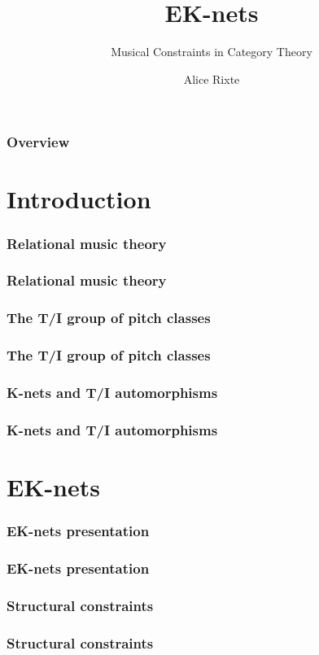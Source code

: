 \documentclass{beamer}
\title{EK-nets}
\subtitle{Musical Constraints in Category Theory}
\author{Alice Rixte}
\institute[IRCAM]{ENS Paris-Saclay, IRCAM, CNRS, Sorbonne Université}
\date{\displaydate{date}}
\begin{document}
\begin{frame}
	\titlepage
\end{frame}

\begin{frame}
	\frametitle{Overview}
	\tableofcontents
\end{frame}

\section{Introduction}

\subsubsection{Relational music theory}
\begin{frame}
	\frametitle{Relational music theory}
\end{frame}

\subsubsection{The T/I group of pitch classes}
\begin{frame}
	\frametitle{The T/I group of pitch classes}
\end{frame}

\subsubsection{K-nets and T/I automorphisms}
\begin{frame}
	\frametitle{K-nets and T/I automorphisms}
\end{frame}


\section{EK-nets}

\subsubsection{EK-nets presentation}
\begin{frame}
	\frametitle{EK-nets presentation}
\end{frame}

\subsubsection{Structural constraints}
\begin{frame}
	\frametitle{Structural constraints}
\end{frame}
\end{document}
